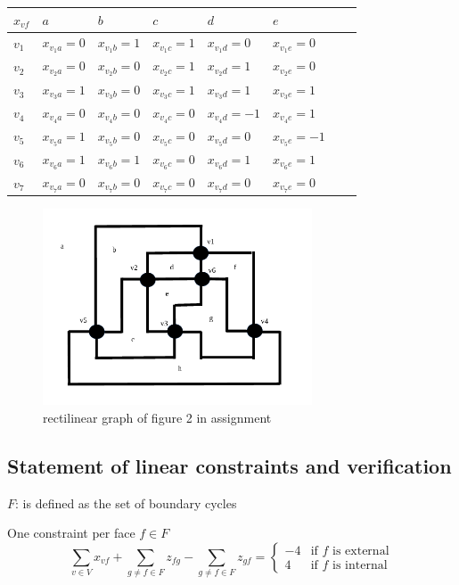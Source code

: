 \begin{tabular}{l|lllllll}
$x_{vf}$ & $a$ & $b$ & $c$ & $d$ & $e$ \\ \hline
$v_1$ & $x_{v_1a} = 0 $ & $x_{v_1b} = 1 $ & $x_{v_1c} = 1 $ & $x_{v_1d} = 0 $ & $x_{v_1e} = 0 $ \\
$v_2$ & $x_{v_2a} = 0 $ & $x_{v_2b} = 0 $ & $x_{v_2c} = 1 $ & $x_{v_2d} = 1 $ & $x_{v_2e} = 0 $ \\
$v_3$ & $x_{v_3a} = 1 $ & $x_{v_3b} = 0 $ & $x_{v_3c} = 1 $ & $x_{v_3d} = 1 $ & $x_{v_3e} = 1 $ \\
$v_4$ & $x_{v_4a} = 0 $ & $x_{v_4b} = 0 $ & $x_{v_4c} = 0 $ & $x_{v_4d} = -1 $ & $x_{v_4e} = 1 $ \\
$v_5$ & $x_{v_5a} = 1 $ & $x_{v_5b} = 0 $ & $x_{v_5c} = 0 $ & $x_{v_5d} = 0 $ & $x_{v_5e} = -1 $ \\
$v_6$ & $x_{v_6a} = 1 $ & $x_{v_6b} = 1 $ & $x_{v_6c} = 0 $ & $x_{v_6d} = 1 $ & $x_{v_6e} = 1 $ \\
$v_7$ & $x_{v_7a} = 0 $ & $x_{v_7b} = 0 $ & $x_{v_7c} = 0 $ & $x_{v_7d} = 0 $ & $x_{v_7e} = 0 $ \\
\end{tabular}



\begin{figure}[h!]
 \centering
 \includegraphics[keepaspectratio=true, width=80mm]{../img/rectilinear_graph.png}
 \caption{rectilinear graph of figure 2 in assignment}
\end{figure}

\pagebreak

\subsection{Statement of linear constraints and verification}
$F$: is defined as the set of boundary cycles

One constraint per face $f \in F$
$$\sum_{v \in V}{x_{vf}} + \sum_{g \neq f \in F}{z_{fg}} - \sum_{g \neq f \in F}{z_{gf}} =
\begin{cases} -4 & \text{if $f$ is external} \\ 4 & \text{if $f$ is internal}\end{cases}
$$

